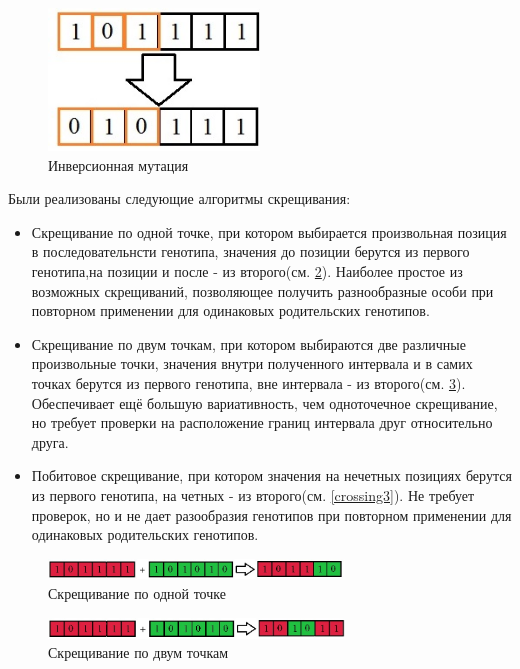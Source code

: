 	\begin{figure}[htbp]
	\includegraphics[width=0.5\textwidth]{./Pics/2.jpg}
		\caption{Инверсионная мутация}
	\label{mutation2}
	\end{figure}	
\FloatBarrier
 Были реализованы следующие алгоритмы скрещивания:
 \begin{itemize}
	\item Скрещивание по одной точке, при котором выбирается произвольная позиция в последовательнсти генотипа, значения до позиции берутся из первого генотипа,на позиции и после - из второго(см. \ref{crossing1}). Наиболее простое из возможных скрещиваний, позволяющее получить разнообразные особи при повторном применении для одинаковых родительских генотипов.
	\item Скрещивание по двум точкам, при котором выбираются две различные произвольные точки, значения внутри полученного интервала и в самих точках берутся из первого генотипа, вне интервала - из второго(см. \ref{crossing2}). Обеспечивает ещё большую вариативность, чем одноточечное скрещивание, но требует проверки на расположение границ интервала друг относительно друга.
	\item Побитовое скрещивание, при котором значения на нечетных позициях берутся из первого генотипа, на четных - из второго(см. \ref{crossing3}). Не требует проверок, но и не дает разообразия генотипов при повторном применении для одинаковых родительских генотипов.
 \end{itemize}
\FloatBarrier
	\begin{figure}[htbp]
	\includegraphics[width=0.7\textwidth]{./Pics/3.jpg}
	\caption{Скрещивание по одной точке}
	\label{crossing1}
\end{figure}

	\begin{figure}[htbp]
	\includegraphics[width=0.7\textwidth]{./Pics/4.jpg}
	\caption{Скрещивание по двум точкам}
	\label{crossing2}
\end{figure}

